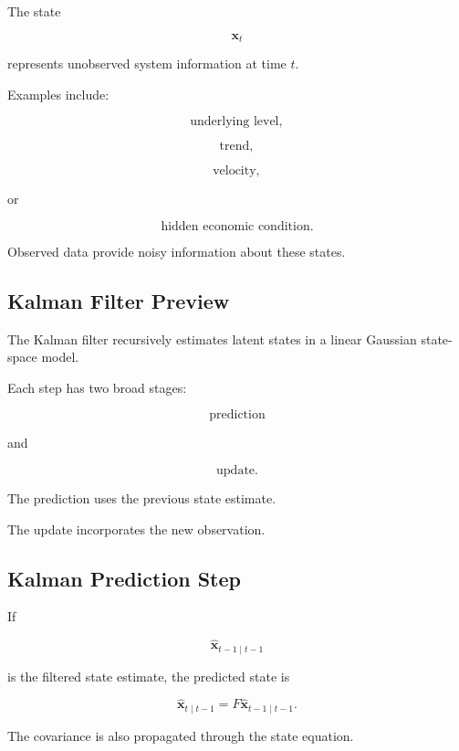 The state

\[
\mathbf{x}_t
\]

represents unobserved system information at time \(t\).

Examples include:

\[
\boxed{
\text{underlying level},
}
\]

\[
\boxed{
\text{trend},
}
\]

\[
\boxed{
\text{velocity},
}
\]

or

\[
\boxed{
\text{hidden economic condition}.
}
\]

Observed data provide noisy information about these states.

\subsection{Kalman Filter Preview}
\label{subsec:kalman-filter-preview}

The Kalman filter recursively estimates latent states in a linear
Gaussian state-space model.

Each step has two broad stages:

\[
\boxed{
\text{prediction}
}
\]

and

\[
\boxed{
\text{update}.
}
\]

The prediction uses the previous state estimate.

The update incorporates the new observation.

\subsection{Kalman Prediction Step}
\label{subsec:kalman-prediction}

If

\[
\widehat{\mathbf{x}}_{t-1\mid t-1}
\]

is the filtered state estimate, the predicted state is

\[
\boxed{
\widehat{\mathbf{x}}_{t\mid t-1}
=
F
\widehat{\mathbf{x}}_{t-1\mid t-1}.
}
\]

The covariance is also propagated through the state equation.

